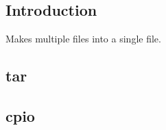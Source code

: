 
\subsection{Introduction}

Makes multiple files into a single file.

\subsection{tar}

\subsection{cpio}

